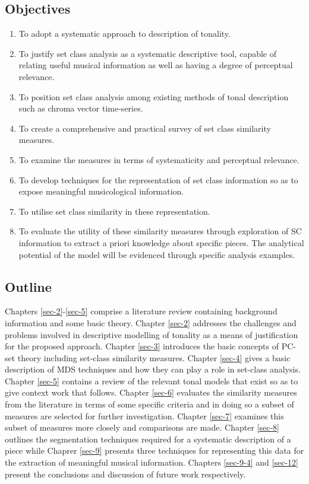 \documentclass{article}
\begin{document}
\subsection{Objectives}
\label{sec-1-2}

\begin{enumerate}
\item To adopt a systematic approach to description of tonality.
\item To justify set class analysis as a systematic descriptive tool,
   capable of relating useful musical information as well as having a
   degree of perceptual relevance.
\item To position set class analysis among existing methods of tonal
   description such as chroma vector time-series.
\item To create a comprehensive and practical survey of set class
   similarity measures.
\item To examine the measures in terms of systematicity and perceptual
   relevance.
\item To develop techniques for the representation of set class
   information so as to expose meaningful musicological information.
\item To utilise set class similarity in these representation.
\item To evaluate the utility of these similarity measures through
   exploration of SC information to extract a priori knowledge about
   specific pieces. The analytical potential of the model will be
   evidenced through specific analysis examples.
\end{enumerate}
\subsection{Outline}
\label{sec-1-3}

Chapters \ref{sec-2}-\ref{sec-5} comprise a literature
review containing background information and some basic
theory. Chapter \ref{sec-2} addresses the challenges and problems
involved in descriptive modelling of tonality as a means of
justification for the proposed approach. Chapter \ref{sec-3} introduces the basic concepts of PC-set theory including
set-class similarity measures. Chapter \ref{sec-4} gives
a basic description of MDS techniques and how they can play a role in
set-class analysis. Chapter \ref{sec-5} contains a
review of the relevant tonal models that exist so as to give context
work that follows. Chapter \ref{sec-6} evaluates the
similarity measures from the literature in terms of some specific
criteria and in doing so a subset of measures are selected for further
investigation. Chapter \ref{sec-7} examines this subset of measures
more closely and comparisons are made. Chapter \ref{sec-8} outlines
the segmentation techniques required for a systematic description of a
piece while Chaprer \ref{sec-9} presents three techniques for
representing this data for the extraction of meaningful musical
information. Chapters \ref{sec-9-4} and \ref{sec-12} present the
conclusions and discussion of future work respectively.
\end{document}
